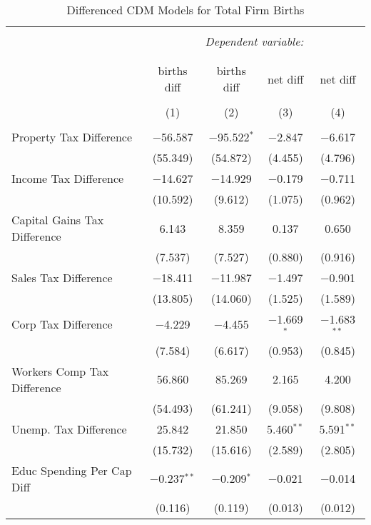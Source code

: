 
\begin{table}[!htbp] \centering 
  \caption{Differenced CDM Models for  Total Firm Births} 
  \label{} 
\begin{tabular}{@{\extracolsep{5pt}}lcccc} 
\\[-1.8ex]\hline 
\hline \\[-1.8ex] 
 & \multicolumn{4}{c}{\textit{Dependent variable:}} \\ 
\cline{2-5} 
\\[-1.8ex] & \multicolumn{4}{c}{ } \\ 
 & births diff & births diff & net diff & net diff \\ 
\\[-1.8ex] & (1) & (2) & (3) & (4)\\ 
\hline \\[-1.8ex] 
 Property Tax Difference & $-$56.587 & $-$95.522$^{*}$ & $-$2.847 & $-$6.617 \\ 
  & (55.349) & (54.872) & (4.455) & (4.796) \\ 
  Income Tax Difference & $-$14.627 & $-$14.929 & $-$0.179 & $-$0.711 \\ 
  & (10.592) & (9.612) & (1.075) & (0.962) \\ 
  Capital Gains Tax Difference & 6.143 & 8.359 & 0.137 & 0.650 \\ 
  & (7.537) & (7.527) & (0.880) & (0.916) \\ 
  Sales Tax Difference & $-$18.411 & $-$11.987 & $-$1.497 & $-$0.901 \\ 
  & (13.805) & (14.060) & (1.525) & (1.589) \\ 
  Corp Tax Difference & $-$4.229 & $-$4.455 & $-$1.669$^{*}$ & $-$1.683$^{**}$ \\ 
  & (7.584) & (6.617) & (0.953) & (0.845) \\ 
  Workers Comp Tax Difference & 56.860 & 85.269 & 2.165 & 4.200 \\ 
  & (54.493) & (61.241) & (9.058) & (9.808) \\ 
  Unemp. Tax Difference & 25.842 & 21.850 & 5.460$^{**}$ & 5.591$^{**}$ \\ 
  & (15.732) & (15.616) & (2.589) & (2.805) \\ 
  Educ Spending Per Cap Diff & $-$0.237$^{**}$ & $-$0.209$^{*}$ & $-$0.021 & $-$0.014 \\ 
  & (0.116) & (0.119) & (0.013) & (0.012) \\ 

\end{tabular}
\end{table}
